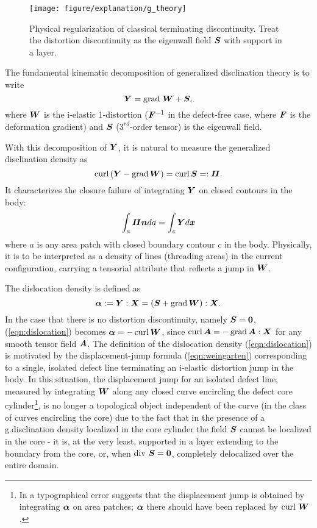 \documentclass[11pt,letterpaper]{article}
\begin{document}
\begin{figure}
\centering
\texttt{[image: figure/explanation/g\_theory]}
\caption{Physical regularization of classical terminating discontinuity. Treat the distortion discontinuity as the eigenwall field $\bfS$ with support in a layer. }
\label{fig:g_theory}
\end{figure}

The fundamental kinematic decomposition of generalized disclination theory \cite{acharya2015continuum} is to write
\begin{equation}\label{eqn:Y-decomp}
\bfY = \grad\, \bfW + \bfS,
\end{equation}
where $\bfW$ is the i-elastic 1-distortion ($\bfF^{-1}$ in the defect-free case, where $\bfF$ is the deformation gradient) and $\bfS$ ($3^{rd}$-order tensor) is the eigenwall field.

With this decomposition of $\bfY$, it is natural to measure the generalized disclination density as
\begin{equation}\label{Pi-measure}
\curl\left( \bfY - \grad \bfW \right) = \curl \bfS =: \bfPi.
\end{equation}
It characterizes the closure failure of integrating $\bfY$ on closed contours in the body:
\begin{equation}\label{eqn:pi_characterize}
\int_a \bfPi \bfn da = \int_c \bfY d\bfx
\end{equation}
where $a$ is any area patch with closed boundary contour $c$ in
the body. Physically, it is to be interpreted as a density of
lines (threading areas) in the current configuration, carrying a
tensorial attribute that reflects a jump in $\bfW$.

The dislocation density is defined as \cite{acharya2015continuum}
\begin{equation}
\bfalpha := \bfY : \bfX = \left( \bfS + \grad\bfW \right) : \bfX.
\label{eqn:dislocation}
\end{equation}
In the case that there is no distortion discontinuity, namely $\bfS = \bf0$, (\ref{eqn:dislocation}) becomes $\bfalpha = - \curl\bfW$, since $\curl \bfA = - \grad \bfA :\bfX$ for any smooth tensor field $\bfA$. The definition of the dislocation density (\ref{eqn:dislocation}) is motivated by the displacement-jump formula (\ref{eqn:weingarten}) \cite{acharya2015continuum} corresponding to a single, isolated defect line terminating an i-elastic distortion jump in the body. In this situation, the displacement jump for an isolated
defect line, measured by integrating $\bfW$ along any closed curve encircling the defect core cylinder\footnote{In \cite{acharya2015continuum} a typographical error suggests that the displacement jump is obtained by integrating $\bfalpha$ on area patches; $\bfalpha$ there should have been replaced by $\curl\, \bfW$.}, is no longer a topological object independent of the curve (in the class of curves encircling the core) due to the fact that in the presence of a g.disclination density localized in the core cylinder the field $\bfS$ cannot be localized in the core - it is, at the very least, supported in a layer extending to the boundary from the core, or, when $\divergence \,\bfS = \bf0$, completely delocalized over the entire domain.
\end{document}
